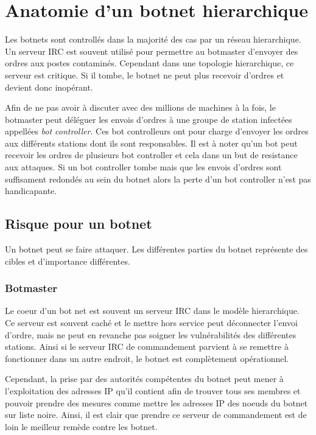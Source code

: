 \section{Anatomie d'un botnet hierarchique}

Les botnets sont controllés dans la majorité des cas par un
réseau hierarchique. Un serveur IRC est souvent utilisé pour
permettre au botmaster d'envoyer des ordres aux postes contaminés.
Cependant dans une topologie hierarchique, ce serveur est critique.
Si il tombe, le botnet ne peut plus recevoir d'ordres et devient donc
inopérant.

Afin de ne pas avoir à discuter avec des millions de machines à la fois,
le botmaster peut déléguer les envois d'ordres à une groupe de station infectées
appellées \textit{bot controller}. Ces bot controlleurs ont pour charge d'envoyer
les ordres aux différents stations dont ils sont responsables. Il est à noter qu'un
bot peut recevoir les ordres de plusieurs bot controller et cela dans un but de resistance
aux attaques. Si un bot controller tombe mais que les envois d'ordres sont suffisament redondés
au sein du botnet alors la perte d'un bot controller n'est pas handicapante.

\subsection{Risque pour un botnet}


Un botnet peut se faire attaquer. Les différentes parties du botnet représente des cibles et
d'importance différentes.

\subsubsection{Botmaster}

Le coeur d'un bot net est souvent un serveur IRC dans le modèle hierarchique.
Ce serveur est souvent caché et le mettre hors service peut déconnecter l'envoi d'ordre, mais ne peut en revanche
pas soigner les vulnérabilités des différentes stations. Ainsi si le serveur IRC de commandement parvient à se remettre
à fonctionner dans un autre endroit, le botnet est complètement opérationnel.

Cependant, la prise par des autorités compétentes du botnet peut mener à l'exploitation des adresses IP qu'il contient
afin de trouver tous ses membres et pouvoir prendre des mesures comme mettre les adresses IP des noeuds du botnet sur liste noire.
Ainsi, il est clair que prendre ce serveur de commandement est de loin le meilleur remède contre les botnet.

